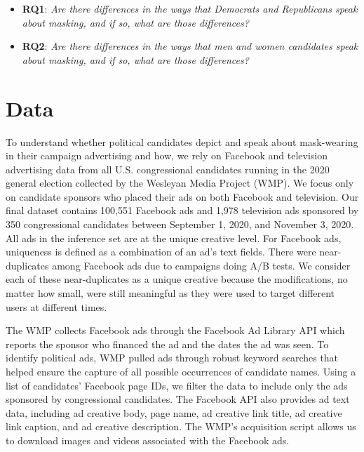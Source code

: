 \begin{itemize}
    \item[] 
        \textbf{RQ1}: \textit{Are there differences in the ways that Democrats and Republicans speak about masking, and if so, what are those differences?}\\
    \item[]
        \textbf{RQ2}: \textit{Are there differences in the ways that men and women candidates speak about masking, and if so, what are those differences?}
 \end{itemize}


\section*{Data}

To understand whether political candidates depict and speak about mask-wearing in their campaign advertising and how, we rely on Facebook and television advertising data from all U.S. congressional candidates running in the 2020 general election collected by the Wesleyan Media Project (WMP). We focus only on candidate sponsors who placed their ads on both Facebook and television. Our final dataset contains 100,551 Facebook ads and 1,978 television ads sponsored by 350 congressional candidates between September 1, 2020, and November 3, 2020. All ads in the inference set are at the unique creative level.  For Facebook ads, uniqueness is defined as a combination of an ad's text fields. There were near-duplicates among Facebook ads due to campaigns doing A/B tests. We consider each of these near-duplicates as a unique creative because the modifications, no matter how small, were still meaningful as they were used to target different users at different times. 

The WMP collects Facebook ads through the Facebook Ad Library API which reports the sponsor who financed the ad and the dates the ad was seen. To identify political ads, WMP pulled ads through robust keyword searches that helped ensure the capture of all possible occurrences of candidate names. Using a list of candidates' Facebook page IDs, we filter the data to include only the ads sponsored by congressional candidates. The Facebook API also provides ad text data, including ad creative body, page name, ad creative link title, ad creative link caption, and ad creative description. The WMP's acquisition script allows us to download images and videos associated with the Facebook ads. 

